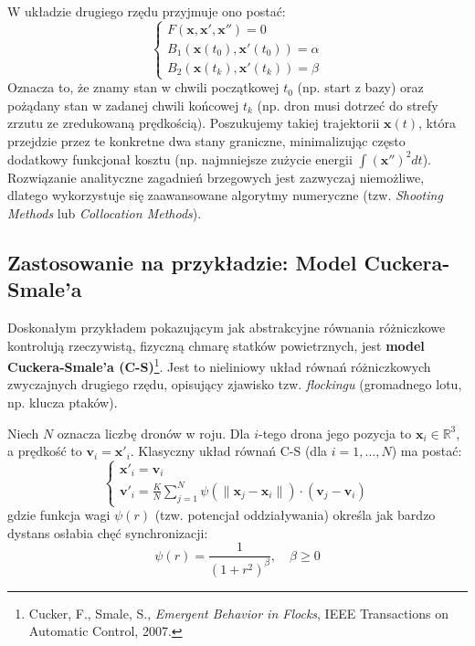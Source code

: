 W układzie drugiego rzędu przyjmuje ono postać:
\begin{equation}
    \begin{cases}
        F(\mathbf{x}, \mathbf{x}', \mathbf{x}'') = 0 \\
        B_1(\mathbf{x}(t_0), \mathbf{x}'(t_0)) = \alpha \\
        B_2(\mathbf{x}(t_k), \mathbf{x}'(t_k)) = \beta
    \end{cases}
\end{equation}
Oznacza to, że znamy stan w chwili początkowej $t_0$ (np. start z bazy) oraz pożądany stan w zadanej chwili końcowej $t_k$ (np. dron musi dotrzeć do strefy zrzutu ze zredukowaną prędkością). Poszukujemy takiej trajektorii $\mathbf{x}(t)$, która przejdzie przez te konkretne dwa stany graniczne, minimalizując często dodatkowy funkcjonał kosztu (np. najmniejsze zużycie energii $\int (\mathbf{x}'')^2 dt$). Rozwiązanie analityczne zagadnień brzegowych jest zazwyczaj niemożliwe, dlatego wykorzystuje się zaawansowane algorytmy numeryczne (tzw. \textit{Shooting Methods} lub \textit{Collocation Methods}).


\subsection{Zastosowanie na przykładzie: Model Cuckera-Smale'a}

Doskonałym przykładem pokazującym jak abstrakcyjne równania różniczkowe kontrolują rzeczywistą, fizyczną chmarę statków powietrznych, jest \textbf{model Cuckera-Smale’a (C-S)}\footnote{Cucker, F., Smale, S., \textit{Emergent Behavior in Flocks}, IEEE Transactions on Automatic Control, 2007.}. Jest to nieliniowy układ równań różniczkowych zwyczajnych drugiego rzędu, opisujący zjawisko tzw. \textit{flockingu} (gromadnego lotu, np. klucza ptaków).

Niech $N$ oznacza liczbę dronów w roju. Dla $i$-tego drona jego pozycja to $\mathbf{x}_i \in \mathbb{R}^3$, a prędkość to $\mathbf{v}_i = \mathbf{x}'_i$. Klasyczny układ równań C-S (dla $i=1,\dots,N$) ma postać:
\begin{equation}
    \begin{cases}
        \mathbf{x}'_i = \mathbf{v}_i \\
        \mathbf{v}'_i = \frac{K}{N} \sum_{j=1}^{N} \psi(\|\mathbf{x}_j - \mathbf{x}_i\|) \cdot (\mathbf{v}_j - \mathbf{v}_i)
    \end{cases}
    \label{eq:cs_original}
\end{equation}
gdzie funkcja wagi $\psi(r)$ (tzw. potencjał oddziaływania) określa jak bardzo dystans osłabia chęć synchronizacji:
\begin{equation}
    \psi(r) = \frac{1}{(1 + r^2)^\beta}, \quad \beta \ge 0
\end{equation}

